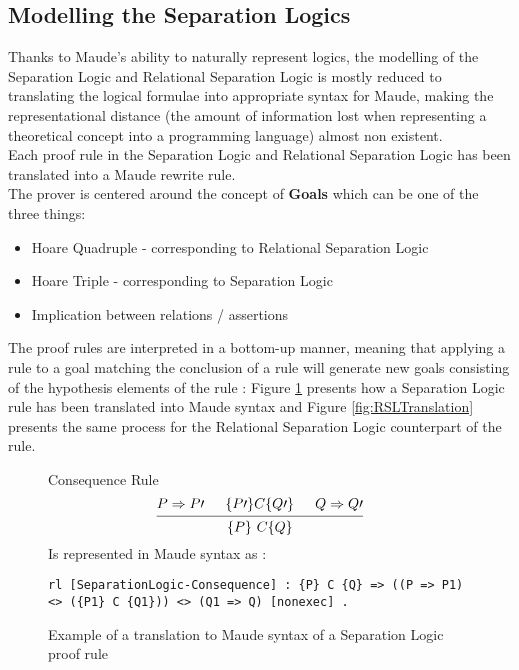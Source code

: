 \documentclass[12pt,a4paper]{article}
\begin{document}
\subsection{Modelling the Separation Logics}
Thanks to Maude's ability to naturally represent logics, the modelling of the Separation Logic and Relational Separation Logic is mostly reduced to translating the logical formulae into appropriate syntax for Maude, making the representational distance (the amount of information lost when representing a theoretical concept into a programming language)\cite{manual} almost non existent. \\

Each proof rule in the Separation Logic and Relational Separation Logic has been translated into a Maude rewrite rule. 
\\
The prover is centered around the concept of \textbf{Goals} which can be one of the three things: 
\begin{itemize}
	\item {Hoare Quadruple} - corresponding to Relational Separation Logic
	\item {Hoare Triple} - corresponding to Separation Logic
	\item {Implication between relations / assertions} 
\end{itemize} 
The proof rules are interpreted in a bottom-up manner, meaning that applying a rule to a goal matching the conclusion of a rule will generate new goals consisting of the hypothesis elements of the rule : Figure \ref{fig:SLTranslation} presents how a Separation Logic rule has been translated into Maude syntax and Figure \ref{fig:RSLTranslation} presents the same process for the Relational Separation Logic counterpart of the rule.
\begin{figure}[h]
	Consequence Rule
	\medskip
	\[
	\begin{prooftree}
	\Hypo{P \Rightarrow P\prime}
	\Hypo{\{P\prime\} C \{Q\prime\}}
	\Hypo{Q \Rightarrow Q\prime}
	\Infer 3 {\{P\}\  C  \{Q\}}
	\end{prooftree}	
	\]
	Is represented in Maude syntax as : 
\begin{lstlisting}[caption=Separation Logic Consequence rule]
	rl [SeparationLogic-Consequence] : {P} C {Q} => ((P => P1) <> ({P1} C {Q1})) <> (Q1 => Q) [nonexec] .
\end{lstlisting}
	\caption{Example of a translation to Maude syntax of a Separation Logic proof rule}
	\label{fig:SLTranslation}
\end{figure}
\end{document}
